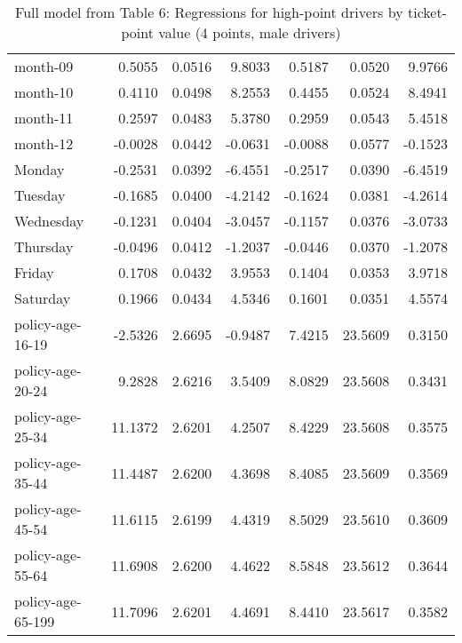 \documentclass[10pt]{article}
\begin{document}
\begin{table}[ht]
\begin{tabular}{lrrrrrr}
  month-09 & 0.5055 & 0.0516 & 9.8033 & 0.5187 & 0.0520 & 9.9766 \\ 
  month-10 & 0.4110 & 0.0498 & 8.2553 & 0.4455 & 0.0524 & 8.4941 \\ 
  month-11 & 0.2597 & 0.0483 & 5.3780 & 0.2959 & 0.0543 & 5.4518 \\ 
  month-12 & -0.0028 & 0.0442 & -0.0631 & -0.0088 & 0.0577 & -0.1523 \\ 
  Monday & -0.2531 & 0.0392 & -6.4551 & -0.2517 & 0.0390 & -6.4519 \\ 
  Tuesday & -0.1685 & 0.0400 & -4.2142 & -0.1624 & 0.0381 & -4.2614 \\ 
  Wednesday & -0.1231 & 0.0404 & -3.0457 & -0.1157 & 0.0376 & -3.0733 \\ 
  Thursday & -0.0496 & 0.0412 & -1.2037 & -0.0446 & 0.0370 & -1.2078 \\ 
  Friday & 0.1708 & 0.0432 & 3.9553 & 0.1404 & 0.0353 & 3.9718 \\ 
  Saturday & 0.1966 & 0.0434 & 4.5346 & 0.1601 & 0.0351 & 4.5574 \\ 
  policy-age-16-19 & -2.5326 & 2.6695 & -0.9487 & 7.4215 & 23.5609 & 0.3150 \\ 
  policy-age-20-24 & 9.2828 & 2.6216 & 3.5409 & 8.0829 & 23.5608 & 0.3431 \\ 
  policy-age-25-34 & 11.1372 & 2.6201 & 4.2507 & 8.4229 & 23.5608 & 0.3575 \\ 
  policy-age-35-44 & 11.4487 & 2.6200 & 4.3698 & 8.4085 & 23.5609 & 0.3569 \\ 
  policy-age-45-54 & 11.6115 & 2.6199 & 4.4319 & 8.5029 & 23.5610 & 0.3609 \\ 
  policy-age-55-64 & 11.6908 & 2.6200 & 4.4622 & 8.5848 & 23.5612 & 0.3644 \\ 
  policy-age-65-199 & 11.7096 & 2.6201 & 4.4691 & 8.4410 & 23.5617 & 0.3582 \\ 
   \hline
\end{tabular}
\caption{Full model from Table 6: Regressions for high-point drivers by ticket-point value (4 points, male drivers)} 
\label{tab_6_4_pts_M}
\end{table}


\clearpage
\pagebreak



\end{document}
